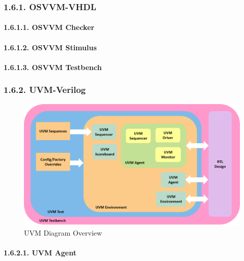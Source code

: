 \documentclass[
]{article}
\begin{document}
\hypertarget{osvvm-vhdl}{%
\subsubsection{1.6.1. OSVVM-VHDL}\label{osvvm-vhdl}}

\hypertarget{osvvm-checker}{%
\paragraph{1.6.1.1. OSVVM Checker}\label{osvvm-checker}}

\hypertarget{osvvm-stimulus}{%
\paragraph{1.6.1.2. OSVVM Stimulus}\label{osvvm-stimulus}}

\hypertarget{osvvm-testbench}{%
\paragraph{1.6.1.3. OSVVM Testbench}\label{osvvm-testbench}}

\hypertarget{uvm-verilog}{%
\subsubsection{1.6.2. UVM-Verilog}\label{uvm-verilog}}

\begin{figure}
\centering
\includegraphics{../mpsoc/uvm-testbench.png}
\caption{UVM Diagram Overview}
\end{figure}

\hypertarget{uvm-agent}{%
\paragraph{1.6.2.1. UVM Agent}\label{uvm-agent}}
\end{document}
